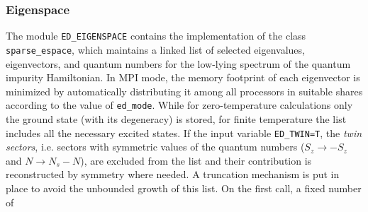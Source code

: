 \documentclass[edipack_sp.tex]{subfiles}
\begin{document}
\subsubsection{Eigenspace}\label{CodeEigenspace}
The module {\tt ED\_EIGENSPACE} contains the implementation of the 
class {\tt sparse\_espace}, which maintains a linked list 
of selected eigenvalues, eigenvectors, and quantum numbers for the 
low-lying spectrum of the quantum impurity Hamiltonian. 
In MPI mode, the memory footprint of each eigenvector 
is minimized by automatically distributing it among all processors in suitable shares
according to the value of {\tt ed\_mode}. 
While for zero-temperature calculations only the ground state (with its
degeneracy) is stored, for finite temperature the list includes all the necessary excited states.
If the input variable {\tt ED\_TWIN=T}, the {\it twin sectors}, i.e. sectors with symmetric values of the quantum numbers ($S_z\to -S_z$ and $N\to N_s-N$), are excluded from the list and their contribution is reconstructed by symmetry where needed. 
A truncation mechanism is put in place to avoid the unbounded growth of this list. On the first call, a fixed number of
\end{document}
